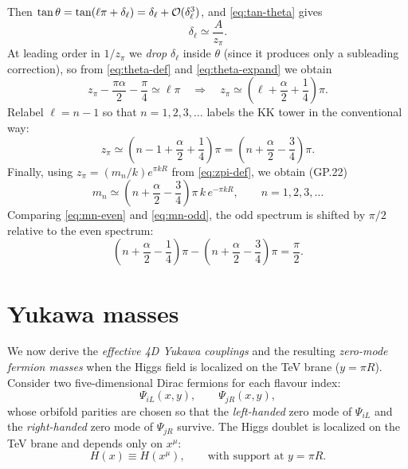 \documentclass[11pt]{article}
\begin{document}
Then $\tan\theta=\tan(\ell\pi+\delta_\ell)=\delta_\ell+{\cal O}(\delta_\ell^3)$, and
\eqref{eq:tan-theta} gives
\begin{equation}
\delta_\ell \simeq \frac{A}{z_\pi}.
\label{eq:delta}
\end{equation}
At leading order in $1/z_\pi$ we \emph{drop} $\delta_\ell$ inside $\theta$ (since it produces only
a subleading correction), so from \eqref{eq:theta-def} and \eqref{eq:theta-expand} we obtain
\begin{equation}
z_\pi-\frac{\pi\alpha}{2}-\frac{\pi}{4}\simeq \ell\pi
\quad\Longrightarrow\quad
z_\pi \simeq \left(\ell+\frac{\alpha}{2}+\frac{1}{4}\right)\pi.
\label{eq:even-zpi-ell}
\end{equation}
Relabel $\ell=n-1$ so that $n=1,2,3,\dots$ labels the KK tower in the conventional way:
\begin{equation}
z_\pi \simeq \left(n-1+\frac{\alpha}{2}+\frac{1}{4}\right)\pi
=
\left(n+\frac{\alpha}{2}-\frac{3}{4}\right)\pi.
\label{eq:even-zpi-n}
\end{equation}
Finally, using $z_\pi=(m_n/k)e^{\pi kR}$ from \eqref{eq:zpi-def}, we obtain (GP.22)
\begin{equation}
\boxed{
m_n \simeq \left(n+\frac{\alpha}{2}-\frac{3}{4}\right)\pi\,k\,e^{-\pi kR},
\qquad n=1,2,3,\dots
}
\label{eq:mn-even}
\end{equation}
Comparing \eqref{eq:mn-even} and \eqref{eq:mn-odd}, the odd spectrum is shifted by $\pi/2$
relative to the even spectrum:
\[
\left(n+\frac{\alpha}{2}-\frac{1}{4}\right)\pi
-\left(n+\frac{\alpha}{2}-\frac{3}{4}\right)\pi
=\frac{\pi}{2}.
\]

\section{Yukawa masses}

We now derive the \emph{effective 4D Yukawa couplings} and the resulting \emph{zero-mode fermion
masses} when the Higgs field is localized on the TeV brane ($y=\pi R$). Consider two five-dimensional Dirac fermions for each flavour index:
\[
\Psi_{iL}(x,y),\qquad \Psi_{jR}(x,y),
\]
whose orbifold parities are chosen so that the \emph{left-handed} zero mode of $\Psi_{iL}$ and the
\emph{right-handed} zero mode of $\Psi_{jR}$ survive. The Higgs doublet is localized on the TeV brane
and depends only on $x^\mu$:
\[
H(x)\equiv H(x^\mu), \qquad \text{with support at } y=\pi R.
\]
\end{document}
